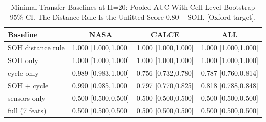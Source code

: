 \documentclass[preprint,12pt]{elsarticle}
\begin{document}
\begin{table}[!t]
\caption{GRU Transfer at H=20 on the Common Feature Set: Seed-Averaged Per-Cell AUC ($\pm$ SD Over Seeds 42, 1, 7).}
\label{tab:gru}
\centering
\small
{}
\end{table}

\begin{table}
\centering
\caption{Minimal Transfer Baselines at H=20: Pooled AUC With Cell-Level Bootstrap 95\% CI. The Distance Rule Is the Unfitted Score $0.80-$SOH. [Oxford target].}
\label{tab:baselines-oxford}
\begin{tabular}{lccc}
\toprule
\textbf{Baseline} & \textbf{NASA} & \textbf{CALCE} & \textbf{ALL} \\
\midrule
SOH distance rule & 1.000 [1.000,1.000] & 1.000 [1.000,1.000] & 1.000 [1.000,1.000] \\
SOH only & 1.000 [1.000,1.000] & 1.000 [1.000,1.000] & 1.000 [1.000,1.000] \\
cycle only & 0.989 [0.983,1.000] & 0.756 [0.732,0.780] & 0.787 [0.760,0.814] \\
SOH + cycle & 0.990 [0.985,1.000] & 0.797 [0.770,0.825] & 0.818 [0.788,0.848] \\
sensors only & 0.500 [0.500,0.500] & 0.500 [0.500,0.500] & 0.500 [0.500,0.500] \\
full (7 feats) & 0.500 [0.500,0.500] & 0.500 [0.500,0.500] & 0.500 [0.500,0.500] \\
\bottomrule
\end{tabular}
\end{table}
\end{document}

